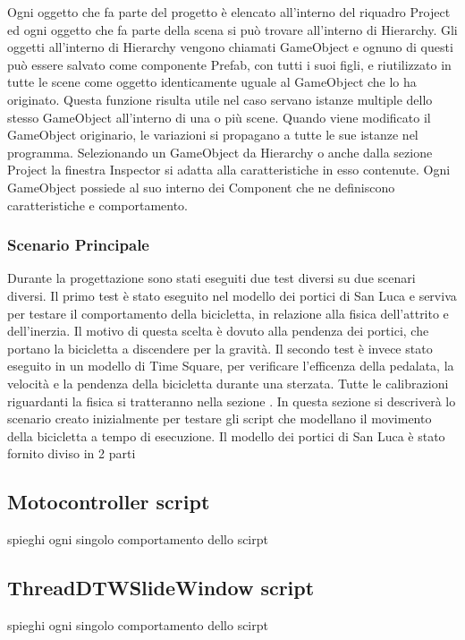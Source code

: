 Ogni oggetto che fa parte del progetto è elencato all’interno del riquadro Project ed ogni oggetto che fa parte della scena si può trovare all’interno di Hierarchy. Gli oggetti all’interno di Hierarchy vengono chiamati GameObject e ognuno di questi può essere salvato come componente Prefab, con tutti i suoi figli, e riutilizzato in tutte le scene come oggetto identicamente uguale al GameObject che lo ha originato. Questa funzione risulta utile nel caso servano istanze multiple dello stesso GameObject all’interno di una o più scene. Quando viene modificato il GameObject originario, le variazioni si propagano a tutte le sue istanze nel programma. Selezionando un GameObject da Hierarchy o anche dalla sezione Project la finestra Inspector si adatta alla caratteristiche in esso contenute. Ogni GameObject possiede al suo interno dei Component che ne definiscono caratteristiche e comportamento.

\subsubsection{Scenario Principale}
Durante la progettazione sono stati eseguiti due test diversi su due scenari diversi. Il primo test è stato eseguito nel modello dei portici di San Luca e serviva per testare il comportamento della bicicletta, in relazione alla fisica dell'attrito e dell'inerzia. Il motivo di questa scelta è dovuto alla pendenza dei portici, che portano la bicicletta a discendere per la gravità. Il secondo test è invece stato eseguito in un modello di Time Square, per verificare l'efficenza della pedalata, la velocità e la pendenza della bicicletta durante una sterzata. Tutte le calibrazioni riguardanti la fisica si tratteranno nella sezione \textit{}. In questa sezione si descriverà lo scenario creato inizialmente per testare gli script che modellano il movimento della bicicletta a tempo di esecuzione. Il modello dei portici di San Luca è stato fornito diviso in 2 parti

\subsection{Motocontroller script}
spieghi ogni singolo comportamento dello scirpt
\subsection{ThreadDTWSlideWindow script}
spieghi ogni singolo comportamento dello scirpt




%
